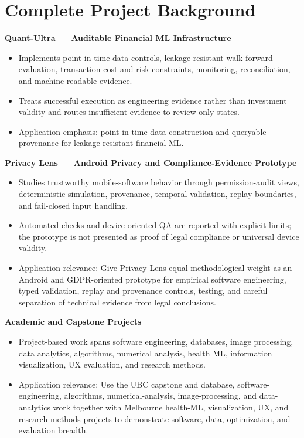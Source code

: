 \documentclass[11pt]{article}
\begin{document}
\section*{Complete Project Background}
\textbf{Quant-Ultra --- Auditable Financial ML Infrastructure}
\begin{itemize}
\item Implements point-in-time data controls, leakage-resistant walk-forward evaluation, transaction-cost and risk constraints, monitoring, reconciliation, and machine-readable evidence.
\item Treats successful execution as engineering evidence rather than investment validity and routes insufficient evidence to review-only states.
\item Application emphasis: point-in-time data construction and queryable provenance for leakage-resistant financial ML.
\end{itemize}

\textbf{Privacy Lens --- Android Privacy and Compliance-Evidence Prototype}
\begin{itemize}
\item Studies trustworthy mobile-software behavior through permission-audit views, deterministic simulation, provenance, temporal validation, replay boundaries, and fail-closed input handling.
\item Automated checks and device-oriented QA are reported with explicit limits; the prototype is not presented as proof of legal compliance or universal device validity.
\item Application relevance: Give Privacy Lens equal methodological weight as an Android and GDPR-oriented prototype for empirical software engineering, typed validation, replay and provenance controls, testing, and careful separation of technical evidence from legal conclusions.
\end{itemize}

\textbf{Academic and Capstone Projects}
\begin{itemize}
\item Project-based work spans software engineering, databases, image processing, data analytics, algorithms, numerical analysis, health ML, information visualization, UX evaluation, and research methods.
\item Application relevance: Use the UBC capstone and database, software-engineering, algorithms, numerical-analysis, image-processing, and data-analytics work together with Melbourne health-ML, visualization, UX, and research-methods projects to demonstrate software, data, optimization, and evaluation breadth.
\end{itemize}
\end{document}
